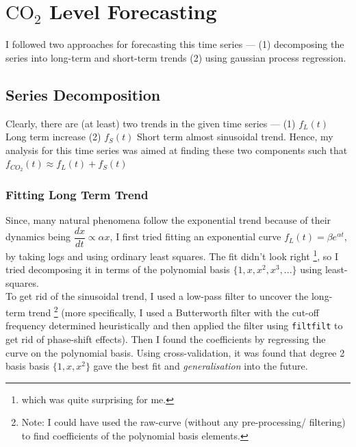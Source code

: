 \documentclass[11pt]{report}
\begin{document}
\maketitle

\section*{$\text{CO}_2$ Level Forecasting}
I followed two approaches for forecasting this time series --- (1) decomposing the series into long-term and short-term trends (2) using gaussian process regression.

\subsection*{Series Decomposition}
Clearly, there are (at least) two trends in the given time series --- (1) $f_L(t)$ Long term increase (2) $f_S(t)$ Short term almost sinusoidal trend. Hence, my analysis for this time series was aimed at finding these two components such that $f_{CO_2}(t) \approx f_L(t) + f_S(t)$

\subsubsection*{Fitting Long Term Trend}
Since, many natural phenomena follow the exponential trend because of their dynamics being $\dfrac{dx}{dt}\propto \alpha x$, I first tried fitting an exponential curve $f_L(t) = \beta e^{\alpha t}$, by taking logs and using ordinary least squares. The fit didn't look right \footnote{which was quite surprising for me.}, so I tried decomposing it in terms of the polynomial basis $\{1,x,x^2,x^3,...\}$ using least-squares.\\

To get rid of the sinusoidal trend, I used a low-pass filter to uncover the long-term trend \footnote{Note: I could have used the raw-curve (without any pre-processing/ filtering) to find coefficients of the polynomial basis elements.} (more specifically, I used a Butterworth filter with the cut-off frequency determined heuristically and then applied the filter using \texttt{filtfilt} to get rid of phase-shift effects). Then I found the coefficients by regressing the curve on the polynomial basis. Using cross-validation, it was found that degree 2 basis basis $\{1,x,x^2\}$ gave the best fit and \emph{generalisation} into the future.\\
\end{document}
